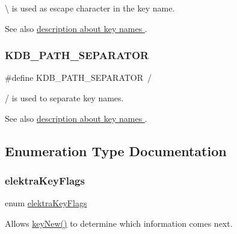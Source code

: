 {\ttfamily \textbackslash{}} is used as escape character in the key name. 

\begin{DoxySeeAlso}{See also}
\hyperlink{group__keyname}{description about key names }. 
\end{DoxySeeAlso}
\mbox{\label{group__key_gad19f92d6d37dc439d1727ca10263c9cc}} 
\subsubsection{\texorpdfstring{K\+D\+B\+\_\+\+P\+A\+T\+H\+\_\+\+S\+E\+P\+A\+R\+A\+T\+OR}{KDB\_PATH\_SEPARATOR}}
{\footnotesize\ttfamily \#define K\+D\+B\+\_\+\+P\+A\+T\+H\+\_\+\+S\+E\+P\+A\+R\+A\+T\+OR~\textquotesingle{}/\textquotesingle{}}



{\ttfamily /} is used to separate key names. 

\begin{DoxySeeAlso}{See also}
\hyperlink{group__keyname}{description about key names }. 
\end{DoxySeeAlso}


\subsection{Enumeration Type Documentation}
\mbox{\label{group__key_ga9b703ca49f48b482def322b77d3e6bc8}} 
\subsubsection{\texorpdfstring{elektra\+Key\+Flags}{elektraKeyFlags}}
{\footnotesize\ttfamily enum \hyperlink{group__key_ga9b703ca49f48b482def322b77d3e6bc8}{elektra\+Key\+Flags}}



Allows \hyperlink{group__key_gad23c65b44bf48d773759e1f9a4d43b89}{key\+New()} to determine which information comes next. 

